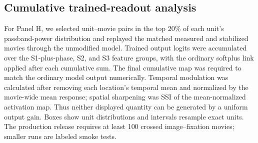 \subsection{Cumulative trained-readout analysis}

For Panel H, we selected unit--movie pairs in the top 20\% of each unit's
passband-power distribution and replayed the matched measured and stabilized
movies through the unmodified model. Trained output logits were accumulated
over the S1-plus-phase, S2, and S3 feature groups, with the ordinary softplus
link applied after each cumulative sum. The final cumulative map was required
to match the ordinary model output numerically. Temporal modulation was
calculated after removing each location's temporal mean and normalized by the
movie-wide mean response; spatial sharpening was SSI of the mean-normalized
activation map. Thus neither displayed quantity can be generated by a uniform
output gain. Boxes show unit distributions and intervals resample exact units.
The production release requires at least 100 crossed image--fixation movies;
smaller runs are labeled smoke tests.
